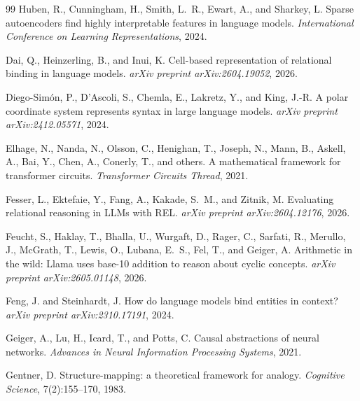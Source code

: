 \documentclass[11pt]{article}
\begin{document}
\begin{thebibliography}{99}
Huben, R., Cunningham, H., Smith, L.~R., Ewart, A., and Sharkey, L.
\newblock Sparse autoencoders find highly interpretable features in language models.
\newblock \emph{International Conference on Learning Representations}, 2024.

Dai, Q., Heinzerling, B., and Inui, K.
\newblock Cell-based representation of relational binding in language models.
\newblock \emph{arXiv preprint arXiv:2604.19052}, 2026.

Diego-Sim\'on, P., D'Ascoli, S., Chemla, E., Lakretz, Y., and King, J.-R.
\newblock A polar coordinate system represents syntax in large language models.
\newblock \emph{arXiv preprint arXiv:2412.05571}, 2024.

Elhage, N., Nanda, N., Olsson, C., Henighan, T., Joseph, N., Mann, B., Askell, A., Bai, Y., Chen, A., Conerly, T., and others.
\newblock A mathematical framework for transformer circuits.
\newblock \emph{Transformer Circuits Thread}, 2021.

Fesser, L., Ektefaie, Y., Fang, A., Kakade, S.~M., and Zitnik, M.
\newblock Evaluating relational reasoning in LLMs with REL.
\newblock \emph{arXiv preprint arXiv:2604.12176}, 2026.

Feucht, S., Haklay, T., Bhalla, U., Wurgaft, D., Rager, C., Sarfati, R., Merullo, J., McGrath, T., Lewis, O., Lubana, E.~S., Fel, T., and Geiger, A.
\newblock Arithmetic in the wild: Llama uses base-10 addition to reason about cyclic concepts.
\newblock \emph{arXiv preprint arXiv:2605.01148}, 2026.

Feng, J. and Steinhardt, J.
\newblock How do language models bind entities in context?
\newblock \emph{arXiv preprint arXiv:2310.17191}, 2024.

Geiger, A., Lu, H., Icard, T., and Potts, C.
\newblock Causal abstractions of neural networks.
\newblock \emph{Advances in Neural Information Processing Systems}, 2021.

Gentner, D.
\newblock Structure-mapping: a theoretical framework for analogy.
\newblock \emph{Cognitive Science}, 7(2):155--170, 1983.


\end{thebibliography}
\end{document}
